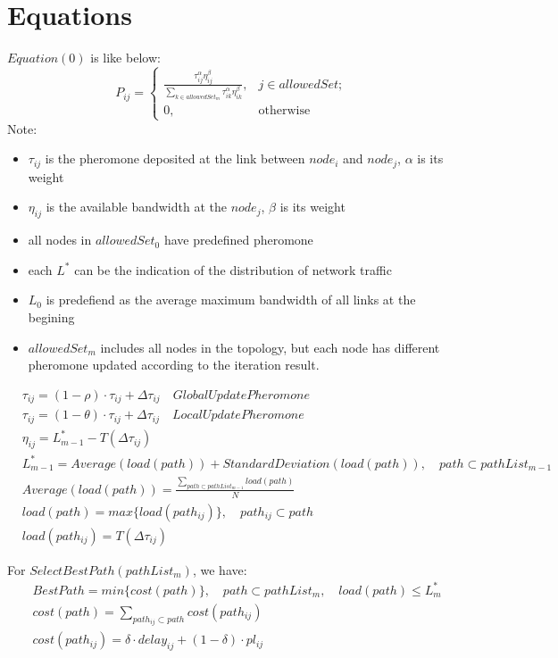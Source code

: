 \documentclass{article}
\begin{document}
\section{Equations}
$Equation(0)$ is like below:
\[
	P_{ij} = \begin{cases}
		\frac{\tau_{ij}^{\alpha}\eta_{ij}^{\beta}}{\sum_{k \in allowedSet_{m}}{\tau_{ik}^{\alpha}\eta_{ik}^{\beta}}}, & j \in \text{$allowedSet$};\\0, & \text{otherwise}
		\end{cases}
\]
Note:
\begin{itemize}
\item $\tau_{ij}$ is the pheromone deposited at the link between $node_{i}$ and $node_{j}$, $\alpha$ is its weight
\item $\eta_{ij}$ is the available bandwidth at the $node_{j}$, $\beta$ is its weight
\item all nodes in $allowedSet_{0}$ have predefined pheromone
\item each $L^\ast$ can be the indication of the distribution of network traffic
\item $L_{0}$ is predefiend as the average maximum bandwidth of all links at the begining
\item $allowedSet_{m}$ includes all nodes in the topology, but each node has different pheromone updated according to the iteration result.
\end{itemize}
\begin{align}
&	\tau_{ij} = (1-\rho) \cdot \tau_{ij} + \Delta\tau_{ij} \quad GlobalUpdatePheromone\\
&	\tau_{ij} = (1-\theta) \cdot \tau_{ij} + \Delta\tau_{ij} \quad LocalUpdatePheromone\\
&	\eta_{ij} = L_{m-1}^\ast - T(\Delta\tau_{ij}) \\
&	L_{m-1}^\ast = Average(load(path)) + StandardDeviation(load(path)),\quad path \subset pathList_{m-1} \\
&	Average(load(path)) = \frac{\sum_{path \subset pathList_{m-1}}{load(path)}}{N} \\
&	load(path) = max\{load(path_{ij})\},\quad path_{ij} \subset path \\
& load(path_{ij}) = T(\Delta\tau_{ij})
\end{align}

For $SelectBestPath(pathList_{m})$, we have:
\begin{align}
&	BestPath = min\{cost(path)\},\quad path \subset pathList_{m},\quad load(path) \leq L_{m}^\ast \\
&	cost(path) = \sum_{path_{ij} \subset path}{cost(path_{ij})} \\
& cost(path_{ij}) = \delta \cdot delay_{ij} + (1-\delta) \cdot pl_{ij}
\end{align}
\end{document}
